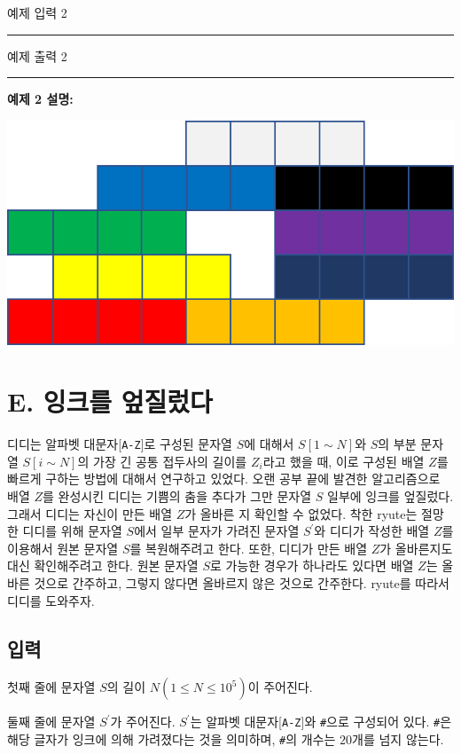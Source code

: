 \documentclass{article}
\def\inputdataname{예제 입력 } %
\def\outputdataname{예제 출력 } %
\newcommand{\iodataNo}[2]{%
	\begin{minipage}{\textwidth}
		\begin{multicols}{2}
			{\inputdataname#2} \\
			\rule{\columnwidth}{1pt}
			
			\columnbreak
			{\outputdataname#2} \\
			\rule{\columnwidth}{1pt}
			
		\end{multicols}
		\vspace{\baselineskip}
	\end{minipage}

}
\begin{document}
\iodataNo{tet2}{2}

\textbf{예제 2 설명:}\newline

\begin{center}
	\includegraphics[scale=0.27]{images/05.png}
\end{center}

\newpage

\section{E. 잉크를 엎질렀다}
디디는 알파벳 대문자[\texttt{A-Z}]로 구성된 문자열 $S$에 대해서 $S[1 \sim N]$와 $S$의 부분 문자열 $S[i \sim N]$의 가장 긴 공통 접두사의 길이를 $Z_i$라고 했을 때, 이로 구성된 배열 $Z$를 빠르게 구하는 방법에 대해서 연구하고 있었다. 오랜 공부 끝에 발견한 알고리즘으로 배열 $Z$를 완성시킨 디디는 기쁨의 춤을 추다가 그만 문자열 $S$ 일부에 잉크를 엎질렀다. 그래서 디디는 자신이 만든 배열 $Z$가 올바른 지 확인할 수 없었다. 착한 ryute는 절망한 디디를 위해 문자열 $S$에서 일부 문자가 가려진 문자열 $S^\prime$와 디디가 작성한 배열 $Z$를 이용해서 원본 문자열 $S$를 복원해주려고 한다. 또한, 디디가 만든 배열 $Z$가 올바른지도 대신 확인해주려고 한다. 원본 문자열 $S$로 가능한 경우가 하나라도 있다면 배열 $Z$는 올바른 것으로 간주하고, 그렇지 않다면 올바르지 않은 것으로 간주한다.  ryute를 따라서 디디를 도와주자.

\subsection{입력}
첫째 줄에 문자열 $S$의 길이 $N(1 \le N \le 10^5)$이 주어진다.

둘째 줄에 문자열 $S^\prime$가 주어진다. $S^\prime$는 알파벳 대문자[\texttt{A-Z}]와 \texttt{\#}으로 구성되어 있다. \texttt{\#}은 해당 글자가 잉크에 의해 가려졌다는 것을 의미하며, \texttt{\#}의 개수는 $20$개를 넘지 않는다.
\end{document}

